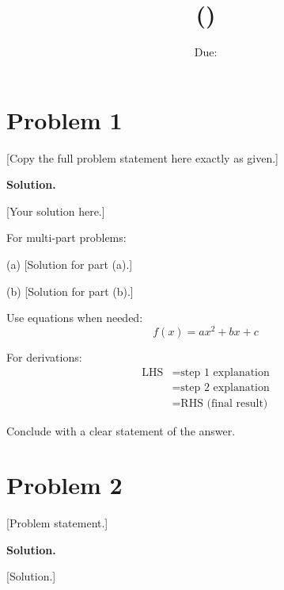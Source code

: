 \documentclass[11pt,a4paper]{article}
\title{\textbf{\coursename} (\coursenumber) \\ \assignmentname}
\author{\studentname}
\date{Due: \duedate}
\newenvironment{solution}{%
    \par\medskip\noindent\textbf{Solution.}\enspace
}{%
    \par\medskip
}
\begin{document}
\maketitle


\section*{Problem 1}
[Copy the full problem statement here exactly as given.]

\begin{solution}
[Your solution here.]

For multi-part problems:

(a) [Solution for part (a).]

(b) [Solution for part (b).]

Use equations when needed:
\begin{equation}
    f(x) = ax^2 + bx + c
\end{equation}

For derivations:
\begin{align*}
    \text{LHS} &= \text{step 1 explanation}\\
    &= \text{step 2 explanation}\\
    &= \text{RHS (final result)}
\end{align*}

Conclude with a clear statement of the answer.
\end{solution}

\newpage

\section*{Problem 2}
[Problem statement.]

\begin{solution}
[Solution.]
\end{solution}

\end{document}
